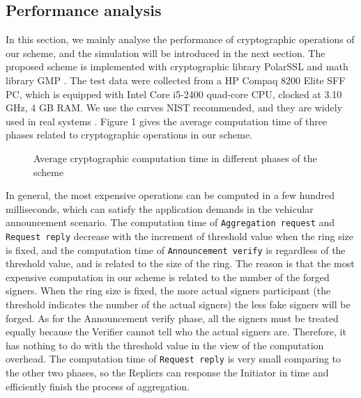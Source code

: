 \documentclass[a4paper]{article}
\begin{document}
\subsection{Performance analysis}
In this section, we mainly analyse the performance of cryptographic operations of our scheme, and the simulation will be introduced in the next section. The proposed scheme is implemented with cryptographic library PolarSSL \cite{POLARSSL} and math library GMP \cite{GMP}. The test data were collected from a HP Compaq 8200 Elite SFF PC, which is equipped with Intel Core i5-2400 quad-core CPU, clocked at 3.10 GHz, 4 GB RAM. We use the curves NIST recommended, and they are widely used in real systems \cite{ANSI9.62}. Figure 1 gives the average computation time of three phases related to cryptographic operations in our scheme.

\begin{figure}
  \centering
  \caption{Average cryptographic computation time in different phases of the scheme}
\end{figure}

In general, the most expensive operations can be computed in a few hundred milliseconds, which can satisfy the application demands in the vehicular announcement scenario. The computation time of \texttt{Aggregation request} and \texttt{Request reply} decrease with the increment of threshold value when the ring size is fixed, and the computation time of \texttt{Announcement verify} is regardless of the threshold value, and is related to the size of the ring. The reason is that the most expensive computation in our scheme is related to the number of the forged signers. When the ring size is fixed, the more actual signers participant (the threshold indicates the number of the actual signers) the less fake signers will be forged. As for the Announcement verify phase, all the signers must be treated equally because the Verifier cannot tell who the actual signers are. Therefore, it has nothing to do with the threshold value in the view of the computation overhead. The computation time of \texttt{Request reply} is very small comparing to the other two phases, so the Repliers can response the Initiator in time and efficiently finish the process of aggregation.
\end{document}
